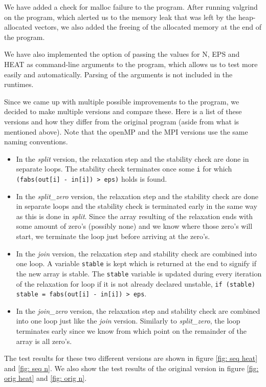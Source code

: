 \documentclass[a4paper]{article}
\begin{document}
\noindent We have added a check for malloc failure to the program. After running valgrind on the program, which alerted us to the memory leak that was left by the heap-allocated vectors, we also added the freeing of the allocated memory at the end of the program.

We have also implemented the option of passing the values for N, EPS and HEAT as command-line arguments to the program, which allows us to test more easily and automatically. Parsing of the arguments is not included in the runtimes.

Since we came up with multiple possible improvements to the program, we decided to make multiple versions and compare these. Here is a list of these versions and how they differ from the original program (aside from what is mentioned above). Note that the openMP and the MPI versions use the same naming conventions.
\begin{itemize}
    \item
        In the \textit{split} version, the relaxation step and the stability check are done in separate loops. The stability check terminates once some \texttt{i} for which \texttt{(fabs(out[i] - in[i]) > eps)} holds is found.
    \item
        In the \textit{split\_zero} version, the relaxation step and the stability check are done in separate loops and the stability check is terminated early in the same way as this is done in \textit{split}. Since the array resulting of the relaxation ends with some amount of zero's (possibly none) and we know where those zero's will start, we terminate the loop just before arriving at the zero's.
    \item
        In the \textit{join} version, the relaxation step and stability check are combined into one loop. A variable \texttt{stable} is kept which is returned at the end to signify if the new array is stable. The \texttt{stable} variable is updated during every iteration of the relaxation for loop if it is not already declared unstable, \texttt{if (stable) stable = fabs(out[i] - in[i]) > eps}.
    \item
        In the \textit{join\_zero} version, the relaxation step and stability check are combined into one loop just like the \textit{join} version. Similarly to \textit{split\_zero}, the loop terminates early since we know from which point on the remainder of the array is all zero's.
\end{itemize}
The test results for these two different versions are shown in figure \ref{fig: seq heat} and \ref{fig: seq n}. We also show the test results of the original version in figure \ref{fig: orig heat} and \ref{fig: orig n}.
\end{document}
